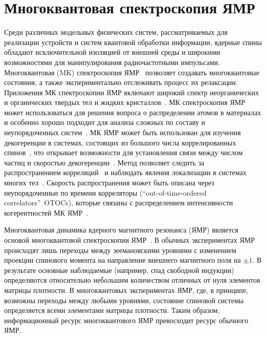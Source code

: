 \section{Многоквантовая спектроскопия ЯМР}
Среди различных модельных физических систем,
рассматриваемых для реализации устройств и систем квантовой обработки информации,
ядерные спины обладают исключительной изоляцией от внешней среды
и широкими возможностями для манипулирования радиочастотными импульсами.
Многоквантовая (MK) спектроскопия ЯМР~\cite{Baum1985} позволяет создавать многоквантовые состояния,
а также экспериментально отслеживать процесс их релаксации.
Приложения МК спектроскопии ЯМР включают широкий спектр неорганических и органических твердых тел и жидких кристаллов~\cite{Hughes2004}.
МК спектроскопия ЯМР может использоваться для решения вопроса о распределении атомов в материалах
и особенно хорошо подходит для анализа сложных по составу и неупорядоченных систем~\cite{Vasilev2018, Avilova2019, Mogami2014}.
МК ЯМР может быть использован для изучения декогеренции в системах,
состоящих из большого числа коррелированных спинов~\cite{Krojanski2006, Cho2006},
что открывает возможности для установления связи между числом частиц и скоростью декогеренции~\cite{Krojanski2006, Bochkin2018}.
Метод позволяет следить за распространением корреляций~\cite{Baum1985, Sanchez2014}
и наблюдать явления локализации в системах многих тел~\cite{Alvarez2015, Wei2018}.
Скорость распространения может быть описана через неупорядоченные по времени корреляторы
(``out-of-time-ordered correlators''~OTOCs),
которые связаны с распределением интенсивности когерентностей МК ЯМР~\cite{Garttner2018, Doronin2019}.


Многоквантовая динамика ядерного магнитного резонанса (ЯМР) является основой многоквантовой спектроскопии ЯМР~\cite{Baum1985}.
В обычных экспериментах ЯМР происходят лишь переходы между зеемановскими уровнями
с изменением проекции спинового момента на направление внешнего магнитного поля на $\pm 1$.
В результате основные наблюдаемые (например, спад свободной индукции) определяются относительно небольшим количеством отличных от нуля элементов матрицы плотности.
В многоквантовых экспериментах ЯМР,
где, в принципе, возможны переходы между любыми уровнями,
состояние спиновой системы определяется всеми элементами матрицы плотности.
Таким образом, информационный ресурс многоквантового ЯМР превосходит ресурс обычного ЯМР.

